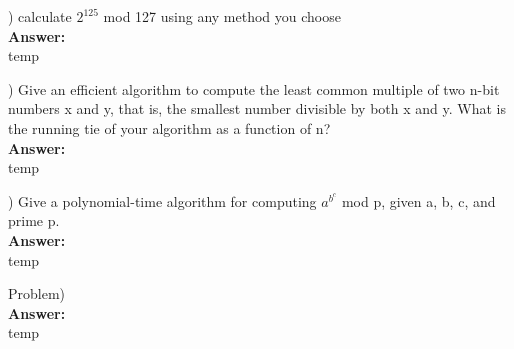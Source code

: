 \documentclass{article}
\begin{document}
\vspace{.3in}
) calculate $2^{125}$ mod 127 using any method you choose \\
\vspace{.1in}
{\bf Answer:} \\
\indent temp

\vspace{.3in}
) Give an efficient algorithm to compute the least common multiple of two 
\indent n-bit numbers x and y, that is, the smallest number divisible by both x and 
\indent y. What is the running tie of your algorithm as a function of n? \\
\vspace{.1in}
{\bf Answer:} \\
\indent temp

\vspace{.3in}
) Give a polynomial-time algorithm for computing $a^{b^c}$ mod p, given a, b, c, 
\indent and prime p. \\
\vspace{.1in}
{\bf Answer:} \\
\indent temp

\vspace{.3in}
\noindent Problem) \\
\vspace{.1in}
{\bf Answer:} \\
\indent temp
\end{document}

